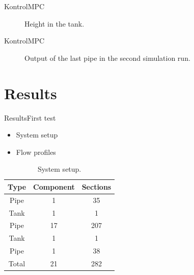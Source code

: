\begin{frame}{Kontrol}{MPC}
\begin{figure}[H]
 \centering
 
\caption{Height in the tank.}
\label{fig:tank_height_first_test}
\end{figure}    


\end{frame}

\begin{frame}{Kontrol}{MPC}
 \begin{figure}[H]
 \centering
 
\caption{Output of the last pipe in the second simulation run.}
\label{fig:MPC_test_output_second_test_with_constraints}
\end{figure}   


\end{frame}



\section{Results}

\begin{frame}{Results}{First test}
\begin{minipage}[t]{0.48\linewidth}
\begin{itemize}
	   	\item System setup
	   	\item Flow profiles 
\end{itemize}    
\end{minipage}\hfill
\begin{minipage}[t]{0.48\linewidth}
\begin{table}[H]
\centering
\begin{tabular}{|c|c|c|}
\hline
	\rowcolor[HTML]{9B9B9B} 
Type  & Component & Sections \\ \hline
Pipe  & 1         & 35       \\ \hline
Tank  & 1         & 1        \\ \hline
Pipe  & 17        & 207      \\ \hline
Tank  & 1         & 1        \\ \hline
Pipe  & 1         & 38        \\ \hline
Total & 21        & 282      \\ \hline
\end{tabular}
\caption{System setup.}
\label{tab:system_setup_nonlinear_linear_testv2}
\end{table}
\end{minipage}



\end{frame}


